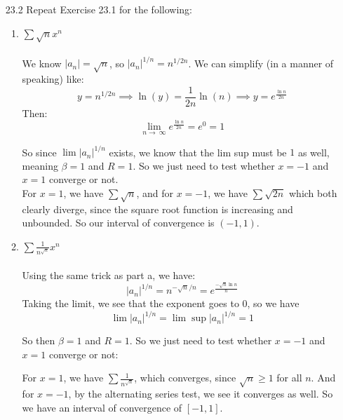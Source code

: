 
\usepackage{amsmath, amssymb, dsfont, mathtools}
\usepackage{graphicx}

\oddsidemargin 0in
\evensidemargin 0in
\textwidth 6.5in
\topmargin -0.5in
\textheight 9.0in
\newcommand{\norm}[1]{\left\lVert #1 \right\rVert}
\newcommand{\abs}[1]{\left\vert #1 \right\vert}
\newcommand{\?}{\stackrel{?}{=}}
\DeclarePairedDelimiter{\ceil}{\lceil}{\rceil}



\pagestyle{myheadings}

\begin{enumerate}
  \item [23.2]
    Repeat Exercise 23.1 for the following:
    \begin{enumerate}
      \item $\sum \sqrt{n} x^n$\\\\

        We know $\abs{a_n} = \sqrt{n}$, so $\abs{a_n}^{1/n} = n^{1/2n}$. We can simplify (in a manner of speaking) like:
        $$y = n^{1/2n} \implies \ln(y) = \frac{1}{2n} \ln(n) \implies y = e^{\frac{\ln n}{2n}}$$
        Then:
        $$\lim_{n \to\ \infty} e^{\frac{\ln n}{2n}} = e^0 = 1$$

        So since $\lim \abs{a_n}^{1/n}$ exists, we know that the lim sup must be $1$ as well, meaning $\beta = 1$ and $R = 1$. So we just need to test whether $x=-1$ and $x=1$ converge or not.\\

        For $x=1$, we have $\sum \sqrt{n}$, and for $x=-1$, we have $\sum \sqrt{2n}$ which both clearly diverge, since the square root function is increasing and unbounded. So our interval of convergence is $(-1,1)$.
      \item $\sum \frac{1}{n^{\sqrt{n}}} x^n$\\\\

        Using the same trick as part a, we have:
        $$\abs{a_n}^{1/n} = n^{- \sqrt{n}/n} = e^{\frac{- \sqrt{n} \ln n}{n}}$$
        Taking the limit, we see that the exponent goes to $0$, so we have
        $$\lim_{} \abs{a_n}^{1/n} = \lim_{} \sup \abs{a_n}^{1/n} = 1$$

        So then $\beta = 1$ and $R=1$. So we just need to test whether $x=-1$ and $x=1$ converge or not:
        
        For $x=1$, we have $\sum \frac{1}{n^{\sqrt{n}}}$, which converges, since $\sqrt{n} \geq 1$ for all $n$. And for $x=-1$, by the alternating series test, we see it converges as well. So we have an interval of convergence of $[-1,1]$.


\end{enumerate}
\end{enumerate}
